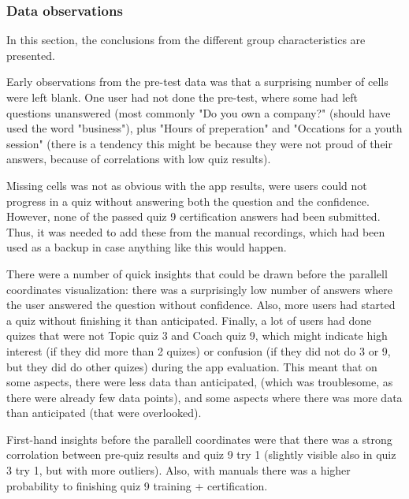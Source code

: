 \subsubsection{Data observations}



In this section, the conclusions from the different group characteristics are presented.

Early observations from the pre-test data was that a surprising number of cells were left blank. One user had not done the pre-test, where some had left questions unanswered (most commonly "Do you own a company?" (should have used the word "business"), plus "Hours of preperation" and "Occations for a youth session" (there is a tendency this might be because they were not proud of their answers, because of correlations with low quiz results).

Missing cells was not as obvious with the app results, were users could not progress in a quiz without answering both the question and the confidence. However, none of the passed quiz 9 certification answers had been submitted. Thus, it was needed to add these from the manual recordings, which had been used as a backup in case anything like this would happen.


There were a number of quick insights that could be drawn before the parallell coordinates visualization: there was a surprisingly low number of answers where the user answered the question without confidence. Also, more users had started a quiz without finishing it than anticipated. Finally, a lot of users had done quizes that were not Topic quiz 3 and Coach quiz 9, which might indicate high interest (if they did more than 2 quizes) or confusion (if they did not do 3 or 9, but they did do other quizes) during the app evaluation. This meant that on some aspects, there were less data than anticipated, (which was troublesome, as there were already few data points), and some aspects where there was more data than anticipated (that were overlooked).

First-hand insights before the parallell coordinates were that there was a strong corrolation between pre-quiz results and quiz 9 try 1 (slightly visible also in quiz 3 try 1, but with more outliers). Also, with manuals there was a higher probability to finishing quiz 9 training + certification.

